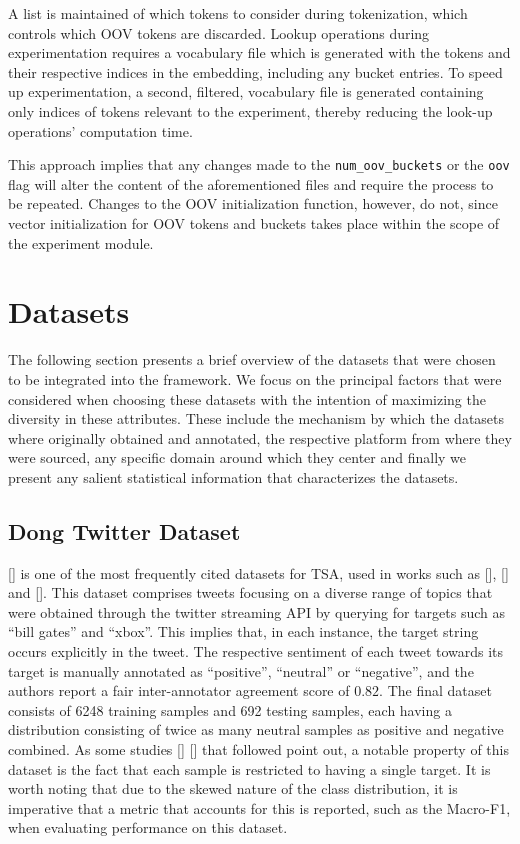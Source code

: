 \documentclass[12pt, a4paper]{report}
\theoremstyle{definition}
\theoremstyle{definition}%
\theoremstyle{definition}%
\theoremstyle{definition}%
\theoremstyle{definition}%
\theoremstyle{definition}%
\renewcommand{\cite}[1]{[\citealp{#1}]}
\begin{document}
A list is maintained of which tokens to consider during tokenization, which controls which OOV tokens are discarded. Lookup operations during experimentation requires a vocabulary file which is generated with the tokens and their respective indices in the embedding, including any bucket entries. To speed up experimentation, a second, filtered, vocabulary file is generated containing only indices of tokens relevant to the experiment, thereby reducing the look-up operations' computation time.

This approach implies that any changes made to the \texttt{num\_oov\_buckets} or the \texttt{oov} flag will alter the content of the aforementioned files and require the process to be repeated. Changes to the OOV initialization function, however, do not, since vector initialization for OOV tokens and buckets takes place within the scope of the experiment module.

\section{Datasets}
The following section presents a brief overview of the datasets that were chosen to be integrated into the framework. We focus on the principal factors that were considered when choosing these datasets with the intention of maximizing the diversity in these attributes. These include the mechanism by which the datasets where originally obtained and annotated, the respective platform from where they were sourced, any specific domain around which they center and finally we present any salient statistical information that characterizes the datasets.

\subsection{Dong Twitter Dataset}
\cite{dong} is one of the most frequently cited datasets for TSA, used in works such as \cite{tang2016b}, \cite{chen2017} and \cite{zheng2018}. This dataset comprises tweets focusing on a diverse range of topics that were obtained through the twitter streaming API by querying for targets such as \enquote{bill gates} and \enquote{xbox}. This implies that, in each instance, the target string occurs explicitly in the tweet. The respective sentiment of each tweet towards its target is manually annotated as \enquote{positive}, \enquote{neutral} or \enquote{negative}, and the authors report a fair inter-annotator agreement score of $0.82$.  The final dataset consists of 6248 training samples and 692 testing samples, each having a distribution consisting of twice as many neutral samples as positive and negative combined. As some studies \cite{wang2017} \cite{saeidi2016} that followed point out, a notable property of this dataset is the fact that each sample is restricted to having a single target. It is worth noting that due to the skewed nature of the class distribution, it is imperative that a metric that accounts for this is reported, such as the Macro-F1, when evaluating performance on this dataset.
\end{document}
